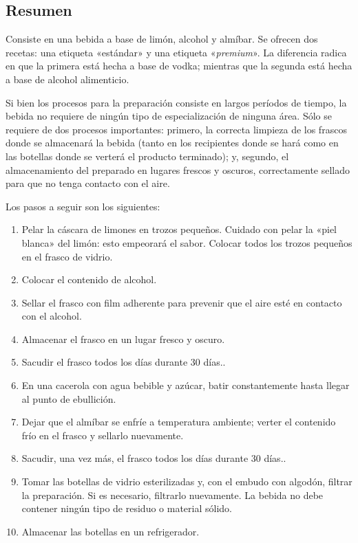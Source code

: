 \documentclass[12pt,a4paper]{article}
\begin{document}
\subsection{Resumen}
Consiste en una bebida a base de limón, alcohol y almíbar. Se ofrecen dos recetas: una etiqueta «estándar» y una etiqueta «\textit{premium}». La diferencia radica en que la primera está hecha a base de vodka; mientras que la segunda está hecha a base de alcohol alimenticio.

Si bien los procesos para la preparación consiste en largos períodos de tiempo, la bebida no requiere de ningún tipo de especialización de ninguna área. Sólo se requiere de dos procesos importantes: primero, la correcta limpieza de los frascos donde se almacenará la bebida (tanto en los recipientes donde se hará como en las botellas donde se verterá el producto terminado); y, segundo, el almacenamiento del preparado en lugares frescos y oscuros, correctamente sellado para que no tenga contacto con el aire.

Los pasos a seguir son los siguientes:

\begin{enumerate}
\item Pelar la cáscara de limones en trozos pequeños. Cuidado con pelar la «piel blanca» del limón: esto empeorará el sabor. Colocar todos los trozos pequeños en el frasco de vidrio.
\item Colocar el contenido de alcohol.
\item Sellar el frasco con film adherente para prevenir que el aire esté en contacto con el alcohol.
\item Almacenar el frasco en un lugar fresco y oscuro.
\item Sacudir el frasco todos los días durante 30 días..
\item En una cacerola con agua bebible y azúcar, batir constantemente hasta llegar al punto de ebullición.
\item Dejar que el almíbar se enfríe a temperatura ambiente; verter el contenido frío en el frasco y sellarlo nuevamente.
\item Sacudir, una vez más, el frasco todos los días durante 30 días..
\item Tomar las botellas de vidrio esterilizadas y, con el embudo con algodón, filtrar la preparación. Si es necesario, filtrarlo nuevamente. La bebida no debe contener ningún tipo de residuo o material sólido.
\item Almacenar las botellas en un refrigerador.
\end{enumerate}
\end{document}
